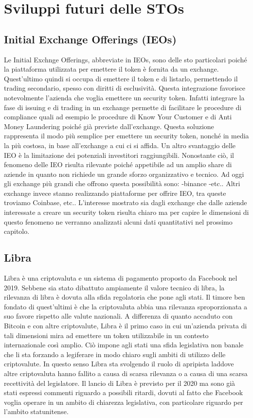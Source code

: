 \chapter{Sviluppi futuri delle STOs}
\section{Initial Exchange Offerings (IEOs)}
Le Initial Exchnge Offerings, abbreviate in IEOs, sono delle sto particolari poiché la piattaforma utilizzata per emettere il token è fornita da un exchange. Quest'ultimo quindi si occupa di emettere il token e di listarlo, permettendo il trading secondario, spesso con diritti di esclusività. Questa integrazione favorisce notevolmente l'azienda che voglia emettere un security token. Infatti integrare la fase di issuing e di trading in un exchange permette di facilitare le procedure di compliance quali ad esempio le procedure di Know Your Customer e di Anti Money 
Laundering poiché già previste dall'exchange. Questa soluzione rappresenta il modo più semplice per emettere un security token, nonché in media la più costosa, in base all'exchange a cui ci si affida. Un altro svantaggio delle IEO è la limitazione dei potenziali investitori raggiungibili. 
Nonostante ciò, il fenomeno delle IEO risulta rilevante poiché appetibile ad un amplio share di aziende in quanto non richiede un grande sforzo organizzativo e tecnico. 
Ad oggi gli exchange più grandi che offrono questa possibilità sono: 
-binance 
-etc..
Altri exchange  invece stanno realizzando piattaforme per offrire IEO, tra queste troviamo Coinbase, etc..
L'interesse mostrato sia dagli exchange che dalle aziende interessate a creare un security token risulta chiaro ma per capire le dimensioni di questo fenomeno ne verranno analizzati alcuni dati quantitativi nel prossimo capitolo. 
\section{Libra}
Libra è una criptovaluta e un sistema di pagamento proposto da Facebook nel 2019. Sebbene sia stato dibattuto ampiamente il valore tecnico di libra, la rilevanza di libra è dovuta alla sfida regolatoria che pone agli stati. Il timore ben fondato di quest'ultimi è che la criptovaluta abbia una rilevanza sproporzionata a suo favore rispetto alle valute nazionali. A differenza di quanto accaduto con Bitcoin e con altre criptovalute, Libra è il primo caso in cui un'azienda privata di tali dimensioni mira ad emettere un token utilizzabile in un contesto internazionale così amplio. Ciò impone agli stati una sfida legislativa non banale che li sta forzando a legiferare in modo chiaro sugli ambiti di utilizzo delle criptovalute. In questo senso Libra sta svolgendo il ruolo di apripista laddove altre criptovaluta hanno fallito a causa di scarsa rilevanza o a causa di una scarsa recettività del legislatore. 
Il lancio di Libra è previsto per il 2020 ma sono già stati espressi commenti riguardo a possibili ritardi, dovuti al fatto che Facebook voglia operare in un ambito di chiarezza legislativa, con particolare riguardo per l'ambito statunitense. 
